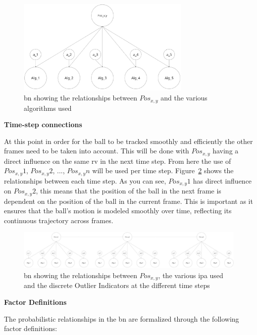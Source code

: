 \documentclass[12pt,a4paper]{article}
\begin{document}
\begin{figure}[H]
	\centering
	\includegraphics[width=0.75\textwidth]{fullBN.jpg}
	\caption{\acl{bn} showing the relationships between $Pos_{x,y}$ and the various algorithms used}
	\label{fig:fullBN}
\end{figure}

\textbf{Time-step connections}

At this point in order for the ball to be tracked smoothly and efficiently the other frames need to be taken into account. This will be done with $Pos_{x,y}$ having a direct influence on the same \acs{rv} in the next time step. From here the use of $Pos_{x,y}1$, $Pos_{x,y}2$, ..., $Pos_{x,y}n$ will be used per time step. Figure~\ref{fig:fulltimeBN} shows the relationships between each time step. As you can see, $Pos_{x,y}1$ has direct influence on $Pos_{x,y}2$, this means that the position of the ball in the next frame is dependent on the position of the ball in the current frame. This is important as it ensures that the ball's motion is modeled smoothly over time, reflecting its continuous trajectory across frames.
 
 \begin{figure}[H]
 	\centering
 	\includegraphics[width=1\textwidth]{BNwtime.jpg}
 	\caption{\acl{bn} showing the relationships between $Pos_{x,y}$, the various \acs{ipa} used and the discrete Outlier Indicators at the different time steps}
 	\label{fig:fulltimeBN}
 \end{figure}

 
\textbf{Factor Definitions}

The probabilistic relationships in the \acs{bn} are formalized through the following factor definitions:
\end{document}
